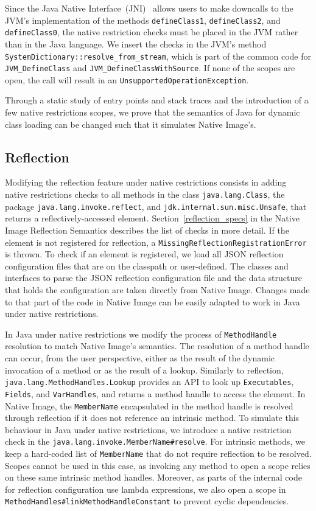 Since the Java Native Interface~(JNI)~\cite{noauthor_jni_nodate} allows users to make downcalls to the JVM's implementation of the methods \verb|defineClass1|, \verb|defineClass2|, and \verb|defineClass0|, the native restriction checks must be placed in the JVM rather than in the Java language. We insert the checks in the JVM's method \verb|SystemDictionary::resolve_from_stream|, which is part of the common code for \verb|JVM_DefineClass| and \verb|JVM_DefineClassWithSource|. If none of the scopes are open, the call will result in an \verb|UnsupportedOperationException|. 

Through a static study of entry points and stack traces and the introduction of a few native restrictions scopes, we prove that the semantics of Java for dynamic class loading can be changed such that it simulates Native Image's.

\subsection{Reflection}
Modifying the reflection feature under native restrictions consists in adding native restrictions checks to all methods in the class \verb|java.lang.Class|, the package \verb|java.lang.invoke.reflect|, and \verb|jdk.internal.sun.misc.Unsafe|, that returns a reflectively-accessed element. Section~\ref{reflection_specs} in the Native Image Reflection Semantics describes the list of checks in more detail. 
If the element is not registered for reflection, a \verb|MissingReflectionRegistrationError| is thrown.
To check if an element is registered, we load all JSON reflection configuration files that are on the classpath or user-defined. The classes and interfaces to parse the JSON reflection configuration file and the data structure that holds the configuration are taken directly from Native Image. Changes made to that part of the code in Native Image can be easily adapted to work in Java under native restrictions.

In Java under native restrictions we modify the process of \verb|MethodHandle| resolution to match Native Image's semantics.
The resolution of a method handle can occur, from the user perspective, either as the result of the dynamic invocation of a method or as the result of a lookup.
Similarly to reflection, \verb|java.lang.MethodHandles.Lookup| provides an API to look up \verb|Executables|, \verb|Fields|, and \verb|VarHandles|, and returns a method handle to access the element. 
In Native Image, the \verb|MemberName| encapsulated in the method handle is resolved through reflection if it does not reference an intrinsic method. To simulate this behaviour in Java under native restrictions, we introduce a native restriction check in the \verb|java.lang.invoke.MemberName#resolve|. 
For intrinsic methods, we keep a hard-coded list of \verb|MemberName| that do not require reflection to be resolved. Scopes cannot be used in this case, as invoking any method to open a scope relies on these same intrinsic method handles.
Moreover, as parts of the internal code for reflection configuration use lambda expressions, we also open a scope in \verb|MethodHandles#linkMethodHandleConstant| to prevent cyclic dependencies.

